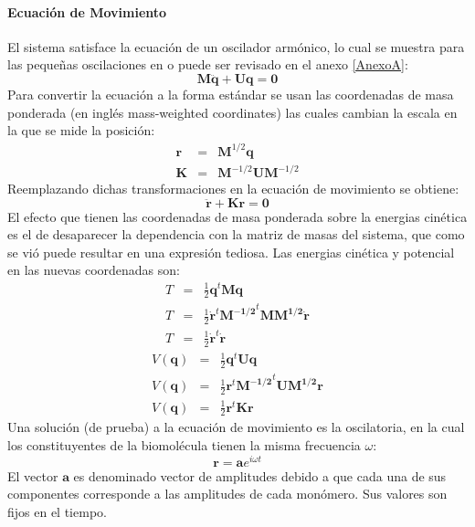 \paragraph{Ecuaci\'{o}n de Movimiento}
El sistema satisface la ecuaci\'{o}n de un oscilador arm\'{o}nico, lo cual se muestra para las peque\~{n}as oscilaciones en \cite[Chapter~6]{Goldstein2001} o puede ser revisado en el anexo \ref{AnexoA}:
\begin{equation}\label{eq:14}
\mathbf{M}\ddot{\mathbf{q}}+\mathbf{U}\mathbf{q}=\mathbf{0}
\end{equation}
Para convertir la ecuaci\'{o}n a la forma est\'{a}ndar se usan las coordenadas de masa ponderada (en ingl\'{e}s mass-weighted coordinates) las cuales cambian la escala en la que se mide la posici\'{o}n:
\begin{eqnarray}\label{eq:15}
\mathbf{r}&=&\mathbf{M}^{1/2}\mathbf{q}\\
\mathbf{K}&=&\mathbf{M}^{-1/2}\mathbf{U}\mathbf{M}^{-1/2}
\end{eqnarray}
Reemplazando dichas transformaciones en la ecuaci\'{o}n de movimiento se obtiene:
\begin{equation}\label{eq:16}
\ddot{\mathbf{r}}+\mathbf{K}\mathbf{r}=\mathbf{0}
\end{equation}
El efecto que tienen las coordenadas de masa ponderada sobre la energias cin\'{e}tica  es el de desaparecer la dependencia con la matriz de masas del sistema, que como se vi\'{o} puede resultar en una expresi\'{o}n tediosa. Las energias cin\'{e}tica y potencial en las nuevas coordenadas son:
\begin{eqnarray}\label{eq:19}
T&=&\frac{1}{2}\mathbf{q}^t\mathbf{M}\mathbf{q} \nonumber \\
T&=&\frac{1}{2}\mathbf{\dot{r}}^t\mathbf{M^{-1/2}}^t\mathbf{M}\mathbf{M^{1/2}}\mathbf{\dot{r}}\nonumber \\
T&=&\frac{1}{2}\mathbf{\dot{r}}^t \mathbf{\dot{r}}
\end{eqnarray}
\begin{eqnarray}\label{eq:20}
V(\mathbf{q})&=&\frac{1}{2}\mathbf{q}^t\mathbf{U}\mathbf{q} \nonumber \\
V(\mathbf{q})&=&\frac{1}{2}\mathbf{r}^t\mathbf{M^{-1/2}}^t\mathbf{U}\mathbf{M^{1/2}}\mathbf{r} \nonumber \\
V(\mathbf{q})&=&\frac{1}{2}\mathbf{r}^t\mathbf{K}\mathbf{r}
\end{eqnarray}
Una soluci\'{o}n (de prueba) a la ecuaci\'{o}n de movimiento es la oscilatoria, en la cual los constituyentes de la biomol\'{e}cula tienen la misma frecuencia $\omega$:
\begin{equation}\label{eq:17}
\mathbf{r}=\mathbf{a}e^{i\omega t}
\end{equation}
El vector $\mathbf{a}$ es denominado vector de amplitudes debido a que cada una de sus componentes corresponde a las amplitudes de cada mon\'{o}mero. Sus valores son fijos en el tiempo.\\

